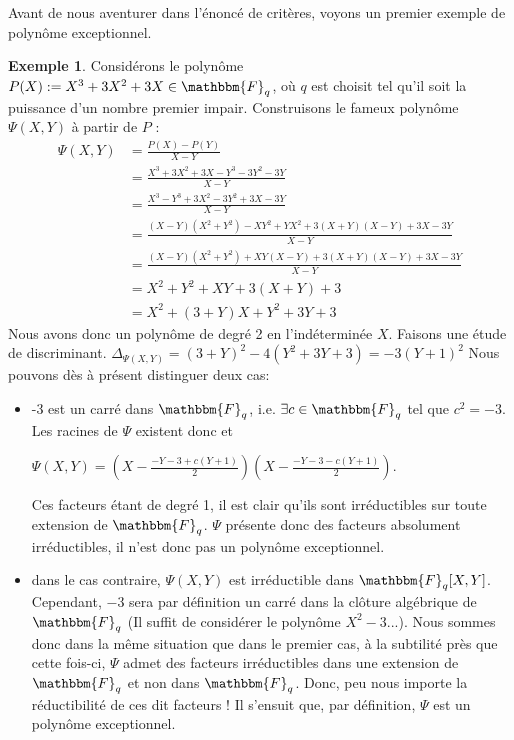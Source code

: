 \documentclass[12pt]{article}
\theoremstyle{remark}\newtheorem{note}{Note}
\theoremstyle{remark}\newtheorem{nota}{Notation}
\newcommand{\Fq}{\mathbbm{F}_q}
\theoremstyle{definition}
\newtheorem{example}{Exemple}
\begin{document}
Avant de nous aventurer dans l'énoncé de critères, voyons un premier exemple de polynôme exceptionnel.

\begin{example}
Considérons le polynôme $P(X) := X^3 +3X^2 + 3X \in \Fq$, où $q$ est choisit tel qu'il soit la puissance d'un nombre premier impair. \newline
Construisons le fameux polynôme $\Psi(X,Y)$ à partir de $P$ :
	\begin{align*}
\Psi(X,Y) &= \displaystyle\frac{P(X) - P(Y)}{X-Y} \\
&= \displaystyle\frac{X^3 + 3X^2 + 3X - Y^3 - 3Y^2 - 3Y}{X -Y} \\
&= \displaystyle\frac{X^3 - Y^3 + 3X^2 - 3Y^2 + 3X - 3Y}{X -Y} \\
&= \displaystyle\frac{(X-Y)(X^2+Y^2) - XY^2 + YX^2 + 3(X+Y)(X-Y) +3X - 3Y}{X -Y} \\
&= \displaystyle\frac{(X-Y)(X^2+Y^2) + XY(X-Y) + 3(X+Y)(X-Y) +3X - 3Y}{X -Y} \\
&= \displaystyle X^2+Y^2 +XY+ 3(X+Y) +3\\
&= X^2 + (3+Y)X + Y^2 + 3Y + 3
	\end{align*}
Nous avons donc un polynôme de degré 2 en l'indéterminée $X$. Faisons une étude de discriminant. \newline
$\Delta_{\Psi(X,Y)} = (3+Y)^2 - 4(Y^2 + 3Y + 3) = -3(Y+1)^2$ \newline 
Nous pouvons dès à présent distinguer deux cas: 
	\begin{itemize}
		\item -3 est un carré dans $\Fq$, i.e. $\exists c\in \Fq$ tel que $c^2 = -3$. Les racines de $\Psi$ existent donc et 
			\begin{center} $\Psi(X,Y) = (\displaystyle X - \frac{-Y -3 + c(Y+1)}{2})( X - \frac{-Y -3 - c(Y+1)}{2})$.\end{center}
Ces facteurs étant de degré 1, il est clair qu'ils sont irréductibles sur toute extension de $\Fq$. $\Psi$ présente donc des facteurs absolument irréductibles, il n'est donc pas un polynôme exceptionnel.
		\item dans le cas contraire, $\Psi(X,Y)$ est irréductible dans $\Fq[X,Y]$. Cependant, $-3$ sera par définition un carré dans la clôture algébrique de $\Fq$ (Il suffit de considérer le polynôme $X^2 - 3$...). Nous sommes donc dans la même situation que dans le premier cas, à la subtilité près que cette fois-ci, $\Psi$ admet des facteurs irréductibles dans une extension de $\Fq$ et non dans $\Fq$. Donc, peu nous importe la réductibilité de ces dit facteurs ! Il s'ensuit que, par définition, $\Psi$ est un polynôme exceptionnel.
		\end{itemize}
\end{example}
\end{document}

